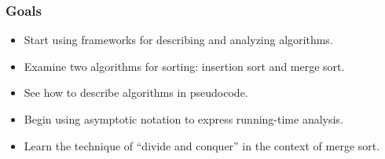 \documentclass[notes,serif]{beamer}
\def\defn#1{{\color{red} #1}}
\begin{document}
\begin{frame}
\frametitle{Goals}

\begin{itemize}
    \item Start using frameworks for describing and analyzing algorithms.
    \item Examine two algorithms for sorting: insertion sort and merge sort.
    \item See how to describe algorithms in pseudocode.
    \item Begin using asymptotic notation to express running-time analysis.
    \item Learn the technique of ``divide and conquer'' in the context of merge sort.
\end{itemize}

%
%
%
%
%
%
%
%
%
%
%
%
%
\end{frame}
\end{document}
